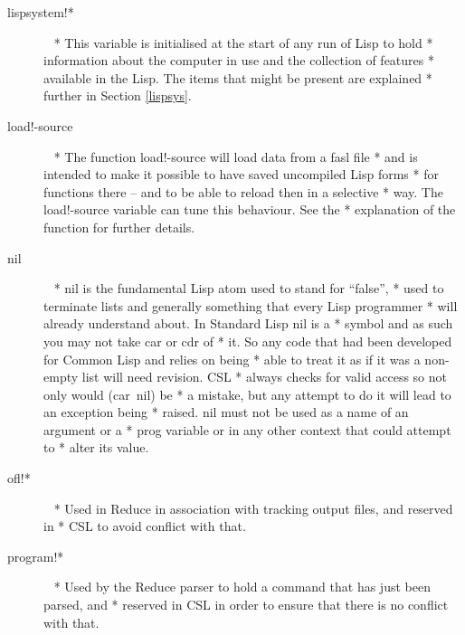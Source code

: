 \documentclass[a4paper,11pt]{article}
\begin{document}
\begin{description}
\item [{\ttfamily lispsystem!*}]  ~\newline
  * This variable is initialised at the start of any run of Lisp to hold
  * information about the computer in use and the collection of features
  * available in the Lisp. The items that might be present are explained
  * further in Section \ref{lispsys}.

\item [{\ttfamily load!-source}]  ~\newline
  * The function {\ttfamily load!-source} will load data from a fasl file
  * and is intended to make it possible to have saved uncompiled Lisp forms
  * for functions there -- and to be able to reload then in a selective
  * way. The {\ttfamily load!-source} variable can tune this behaviour. See the
  * explanation of the function for further details.

\item [{\ttfamily nil}]  ~\newline
  * {\ttfamily nil} is the fundamental Lisp atom used to stand for ``false'',
  * used to terminate lists and generally something that every Lisp programmer
  * will already understand about. In Standard Lisp {\ttfamily nil} is a
  * symbol and as such you may not take {\ttfamily car} or {\ttfamily cdr} of
  * it. So any code that had been developed for Common Lisp and relies on being
  * able to treat it as if it was a non-empty list will need revision. CSL
  * always checks for valid access so not only would {\ttfamily (car~nil)} be
  * a mistake,  but any attempt to do it will lead to an exception being
  * raised. {\ttfamily nil} must not be used as a name of an argument or a
  * {\ttfamily prog} variable or in any other context that could attempt to
  * alter its value.

\item [{\ttfamily ofl!*}]  ~\newline
  * Used in Reduce in association with tracking output files, and reserved in
  * CSL to avoid conflict with that.

\item [{\ttfamily program!*}]  ~\newline
  * Used by the Reduce parser to hold a command that has just been parsed, and
  * reserved in CSL in order to ensure that there is no conflict with that.


\end{description}
\end{document}
